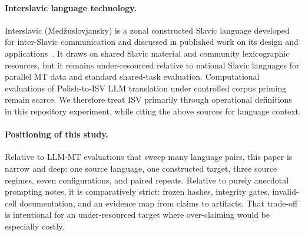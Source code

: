 \paragraph{Interslavic language technology.}
Interslavic (Med\v{z}uslovjansky) is a zonal constructed Slavic language developed for inter-Slavic communication and discussed in published work on its design and applications~\citep{merunka-etal-2019-interslavic,merunka-molhanec-2016-neoslavonic}.
It draws on shared Slavic material and community lexicographic resources, but it remains under-resourced relative to national Slavic languages for parallel MT data and standard shared-task evaluation.
Computational evaluations of Polish-to-ISV LLM translation under controlled corpus priming remain scarce.
We therefore treat ISV primarily through operational definitions in this repository experiment, while citing the above sources for language context.

\paragraph{Positioning of this study.}
Relative to LLM-MT evaluations that sweep many language pairs, this paper is narrow and deep: one source language, one constructed target, three source regimes, seven configurations, and paired repeats.
Relative to purely anecdotal prompting notes, it is comparatively strict: frozen hashes, integrity gates, invalid-cell documentation, and an evidence map from claims to artifacts.
That trade-off is intentional for an under-resourced target where over-claiming would be especially costly.
